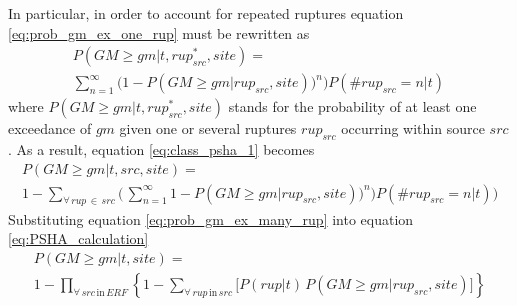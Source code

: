 In particular, in order to account for repeated ruptures equation 
\ref{eq:prob_gm_ex_one_rup} must be rewritten as 
\begin{multline}
P(GM \geq gm|t,rup_{src}^{*},site) = \\
	\sum\limits_{n=1}^{\infty}
	\bigl(1 - P(GM\geq gm|rup_{src},site))^{n}\bigr)
	P(\#rup_{src}=n|t)\,
\label{eq:prob_gm_ex_many_rup}
\end{multline}
where $P(GM \geq gm|t,rup_{src}^*,site)$ stands for the 
probability of at least one exceedance of $gm$ given one or several 
ruptures $rup_{src}$ occurring within source $src$.
% 
As a result, equation \ref{eq:class_psha_1} becomes 
\begin{multline}
P(GM \geq gm|t,src,site) = \\
1 - \sum_{\forall\,rup\,\in\,src}^{} 
	\biggl(\,
	\sum\limits_{n=1}^{\infty}
	1 - P(GM\geq gm|rup_{src},site))^{n}\bigr)
	P(\#rup_{src}=n|t)
	\biggr)
\end{multline}
%
Substituting equation \ref{eq:prob_gm_ex_many_rup} into equation 
\ref{eq:PSHA_calculation}
\begin{multline}
P(GM \geq gm|t,site) = \\
	1-\prod\limits_{\forall\,src\,\text{in}\,ERF}^{}
	\left\{
		1-\sum\limits_{\forall\,rup\,\text{in}\,src}^{} 
			\biggl[ P(rup|t)\,P(GM\geq gm|rup_{src},site)
			\biggr]
	\right\}
\end{multline}
